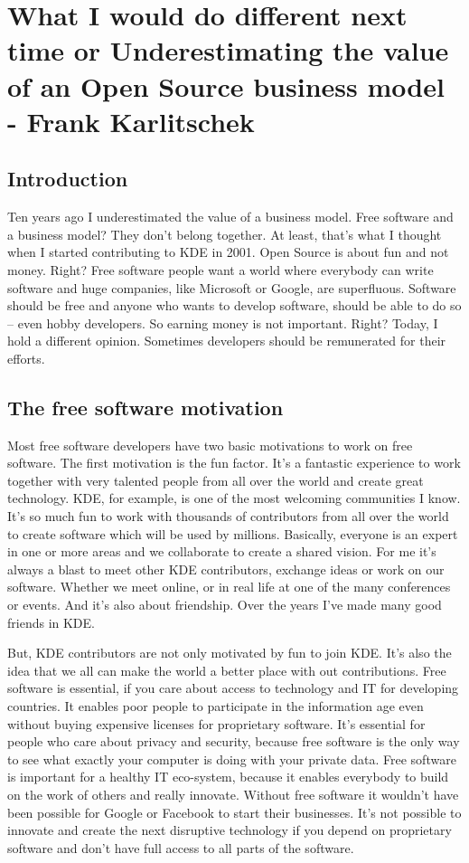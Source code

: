\chapter{What I would do different next time or Underestimating the value of an Open Source business model - Frank Karlitschek}

\section*{Introduction}

Ten years ago I underestimated the value of a business model. Free software and a business model? They don’t belong together. At least, that’s what I thought when I started contributing to KDE in 2001. Open Source is about fun and not money. Right?  Free software people want a world where everybody can write software and huge companies, like Microsoft or Google, are superfluous. Software should be free and anyone who wants to develop software, should be able to do so – even hobby developers. So earning money is not important. Right? Today, I hold a different opinion.  Sometimes developers should be remunerated for their efforts.  

\section*{The free software motivation}

Most free software developers have two basic motivations to work on free software. The first motivation is the fun factor. It's a fantastic experience to work together with very talented people from all over the world and create great technology. KDE, for example, is one of the most welcoming communities I know. It's so much fun to work with thousands of contributors from all over the world to create software which will be used by millions. Basically, everyone is an expert in one or more areas and we collaborate to create a shared vision. For me it's always a blast to meet other KDE contributors, exchange ideas or work on our software. Whether we meet online, or in real life at one of the many conferences or events. And it's also about friendship. Over the years I’ve made many good friends in KDE.

But, KDE contributors are not only motivated by fun to join KDE. It's also the idea that we all can make the world a better place with out contributions. Free software is essential, if you care about access to technology and IT for developing countries. It enables poor people to participate in the information age even without buying expensive licenses for proprietary software. It's essential for people who care about privacy and security, because free software is the only way to see what exactly your computer is doing with your private data. Free software is important for a healthy IT eco-system, because it enables everybody to build on the work of others and really innovate. Without free software it wouldn't have been possible for Google or Facebook to start their businesses. It's not possible to innovate and create the next disruptive technology if you depend on proprietary software and don't have full access to all parts of the software.

